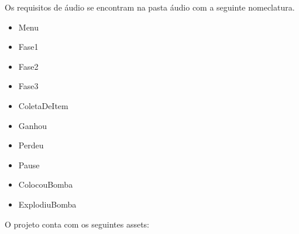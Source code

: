 \documentclass[12pt]{article}
\begin{document}
	Os requisitos de áudio se encontram na pasta áudio
	com a seguinte nomeclatura.

	\begin{itemize}
		\item Menu
		\item Fase1
		\item Fase2
		\item Fase3
		\item ColetaDeItem
		\item Ganhou
		\item Perdeu
		\item Pause
		\item ColocouBomba
		\item ExplodiuBomba
	\end{itemize}

	O projeto conta com os seguintes assets:
\end{document}
